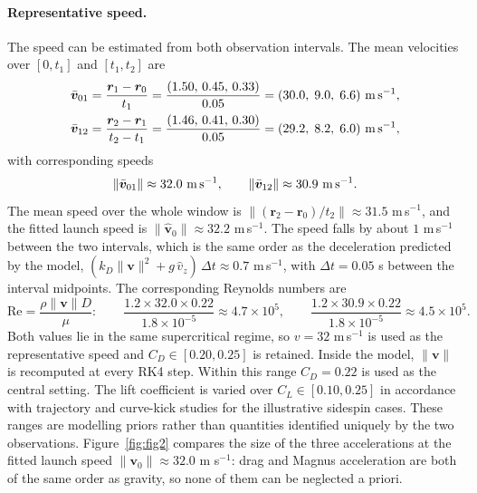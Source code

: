 \documentclass[11pt,a4paper]{article}
\begin{document}
\paragraph{Representative speed.}
The speed can be estimated from both observation intervals. The mean velocities over $[0,t_1]$ and $[t_1,t_2]$ are
\begin{align}
    \bar{\bm v}_{01}&=\frac{\bm r_1-\bm r_0}{t_1}
    =\frac{(1.50,\,0.45,\,0.33)}{0.05}=(30.0,\;9.0,\;6.6)\ {\rm m\,s^{-1}},\\
    \bar{\bm v}_{12}&=\frac{\bm r_2-\bm r_1}{t_2-t_1}
    =\frac{(1.46,\,0.41,\,0.30)}{0.05}=(29.2,\;8.2,\;6.0)\ {\rm m\,s^{-1}},
\end{align}
with corresponding speeds
\begin{equation}
    \|\bar{\bm v}_{01}\|\approx32.0\ {\rm m\,s^{-1}},\qquad
    \|\bar{\bm v}_{12}\|\approx30.9\ {\rm m\,s^{-1}}.
\end{equation}
The mean speed over the whole window is $\|(\bm r_2-\bm r_0)/t_2\|\approx31.5$ m\,s$^{-1}$, and the fitted launch speed is $\|\widehat{\bm v}_0\|\approx32.2$ m\,s$^{-1}$. The speed falls by about $1$ m\,s$^{-1}$ between the two intervals, which is the same order as the deceleration predicted by the model, $(k_D\|\bm v\|^2+g\,\hat v_z)\,\Delta t\approx0.7$ m\,s$^{-1}$, with $\Delta t=0.05$ s between the interval midpoints. The corresponding Reynolds numbers are
\begin{equation}
    \mathrm{Re}=\frac{\rho\|\bm v\|D}{\mu}:\qquad
    \frac{1.2\times32.0\times0.22}{1.8\times10^{-5}}\approx4.7\times10^{5},\qquad
    \frac{1.2\times30.9\times0.22}{1.8\times10^{-5}}\approx4.5\times10^{5}.
\end{equation}
Both values lie in the same supercritical regime, so $v=32$ m\,s$^{-1}$ is used as the representative speed and $C_D\in[0.20,0.25]$ is retained. Inside the model, $\|\bm v\|$ is recomputed at every RK4 step. Within this range $C_D=0.22$ is used as the central setting. The lift coefficient is varied over $C_L\in[0.10,0.25]$ in accordance with trajectory and curve-kick studies \citep{goff2010,carre2002} for the illustrative sidespin cases. These ranges are modelling priors rather than quantities identified uniquely by the two observations. Figure~\ref{fig:fig2} compares the size of the three accelerations at the fitted launch speed $\|\bm v_0\|\approx32.0$ m s$^{-1}$: drag and Magnus acceleration are both of the same order as gravity, so none of them can be neglected a priori.
\end{document}
